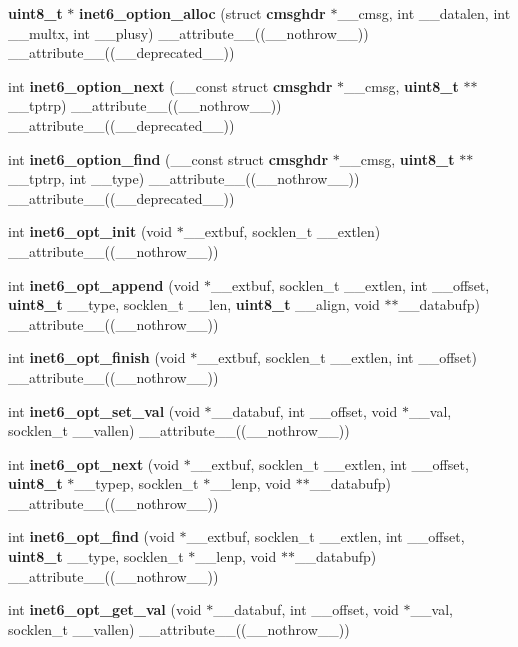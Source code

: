 \begin{DoxyCompactItemize}
\item 
{\bf uint8\_\-t} $\ast$ {\bf inet6\_\-option\_\-alloc} (struct {\bf cmsghdr} $\ast$\_\-\_\-cmsg, int \_\-\_\-datalen, int \_\-\_\-multx, int \_\-\_\-plusy) \_\-\_\-attribute\_\-\_\-((\_\-\_\-nothrow\_\-\_\-)) \_\-\_\-attribute\_\-\_\-((\_\-\_\-deprecated\_\-\_\-))
\item 
int {\bf inet6\_\-option\_\-next} (\_\-\_\-const struct {\bf cmsghdr} $\ast$\_\-\_\-cmsg, {\bf uint8\_\-t} $\ast$$\ast$\_\-\_\-tptrp) \_\-\_\-attribute\_\-\_\-((\_\-\_\-nothrow\_\-\_\-)) \_\-\_\-attribute\_\-\_\-((\_\-\_\-deprecated\_\-\_\-))
\item 
int {\bf inet6\_\-option\_\-find} (\_\-\_\-const struct {\bf cmsghdr} $\ast$\_\-\_\-cmsg, {\bf uint8\_\-t} $\ast$$\ast$\_\-\_\-tptrp, int \_\-\_\-type) \_\-\_\-attribute\_\-\_\-((\_\-\_\-nothrow\_\-\_\-)) \_\-\_\-attribute\_\-\_\-((\_\-\_\-deprecated\_\-\_\-))
\item 
int {\bf inet6\_\-opt\_\-init} (void $\ast$\_\-\_\-extbuf, socklen\_\-t \_\-\_\-extlen) \_\-\_\-attribute\_\-\_\-((\_\-\_\-nothrow\_\-\_\-))
\item 
int {\bf inet6\_\-opt\_\-append} (void $\ast$\_\-\_\-extbuf, socklen\_\-t \_\-\_\-extlen, int \_\-\_\-offset, {\bf uint8\_\-t} \_\-\_\-type, socklen\_\-t \_\-\_\-len, {\bf uint8\_\-t} \_\-\_\-align, void $\ast$$\ast$\_\-\_\-databufp) \_\-\_\-attribute\_\-\_\-((\_\-\_\-nothrow\_\-\_\-))
\item 
int {\bf inet6\_\-opt\_\-finish} (void $\ast$\_\-\_\-extbuf, socklen\_\-t \_\-\_\-extlen, int \_\-\_\-offset) \_\-\_\-attribute\_\-\_\-((\_\-\_\-nothrow\_\-\_\-))
\item 
int {\bf inet6\_\-opt\_\-set\_\-val} (void $\ast$\_\-\_\-databuf, int \_\-\_\-offset, void $\ast$\_\-\_\-val, socklen\_\-t \_\-\_\-vallen) \_\-\_\-attribute\_\-\_\-((\_\-\_\-nothrow\_\-\_\-))
\item 
int {\bf inet6\_\-opt\_\-next} (void $\ast$\_\-\_\-extbuf, socklen\_\-t \_\-\_\-extlen, int \_\-\_\-offset, {\bf uint8\_\-t} $\ast$\_\-\_\-typep, socklen\_\-t $\ast$\_\-\_\-lenp, void $\ast$$\ast$\_\-\_\-databufp) \_\-\_\-attribute\_\-\_\-((\_\-\_\-nothrow\_\-\_\-))
\item 
int {\bf inet6\_\-opt\_\-find} (void $\ast$\_\-\_\-extbuf, socklen\_\-t \_\-\_\-extlen, int \_\-\_\-offset, {\bf uint8\_\-t} \_\-\_\-type, socklen\_\-t $\ast$\_\-\_\-lenp, void $\ast$$\ast$\_\-\_\-databufp) \_\-\_\-attribute\_\-\_\-((\_\-\_\-nothrow\_\-\_\-))
\item 
int {\bf inet6\_\-opt\_\-get\_\-val} (void $\ast$\_\-\_\-databuf, int \_\-\_\-offset, void $\ast$\_\-\_\-val, socklen\_\-t \_\-\_\-vallen) \_\-\_\-attribute\_\-\_\-((\_\-\_\-nothrow\_\-\_\-))
$$
\end{DoxyCompactItemize}
